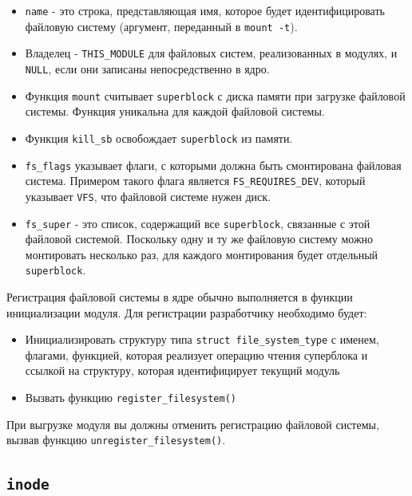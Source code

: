 \documentclass{article}
\begin{document}
    \begin{itemize}
        \item \texttt{name} - это строка, представляющая имя, которое будет
        идентифицировать файловую систему 
        (аргумент, переданный в \texttt{mount -t}).
        \item Владелец - \texttt{THIS\_MODULE} для файловых систем,
        реализованных в модулях, и \texttt{NULL}, если они записаны 
        непосредственно в ядро.
        \item Функция \texttt{mount} считывает \texttt{superblock} с диска
        памяти при загрузке файловой системы. Функция уникальна для каждой
        файловой системы.
        \item Функция \texttt{kill\_sb} освобождает \texttt{superblock} из
        памяти.
        \item \texttt{fs\_flags} указывает флаги, с которыми должна быть
        смонтирована файловая система. Примером такого флага является
        \texttt{FS\_REQUIRES\_DEV}, который указывает \texttt{VFS}, что
        файловой системе нужен диск.
        \item \texttt{fs\_super} - это список, содержащий все \texttt{superblock}, \newline
        связанные с этой файловой системой. Поскольку одну и ту же файловую
        систему можно монтировать несколько раз, для каждого монтирования
        будет отдельный \texttt{superblock}.
    \end{itemize}

    Регистрация файловой системы в ядре обычно выполняется в функции
    инициализации модуля. Для регистрации разработчику необходимо будет:

    \begin{itemize}
        \item Инициализировать структуру типа \texttt{struct file\_system\_type} \newline
        с именем, флагами, функцией, которая реализует операцию чтения суперблока
        и ссылкой на структуру, которая идентифицирует текущий модуль
        \item Вызвать функцию \texttt{register\_filesystem()}
    \end{itemize}

    При выгрузке модуля вы должны отменить регистрацию файловой системы, вызвав
    функцию \texttt{unregister\_filesystem()}.

    \subsection{\texttt{inode}}
\end{document}
